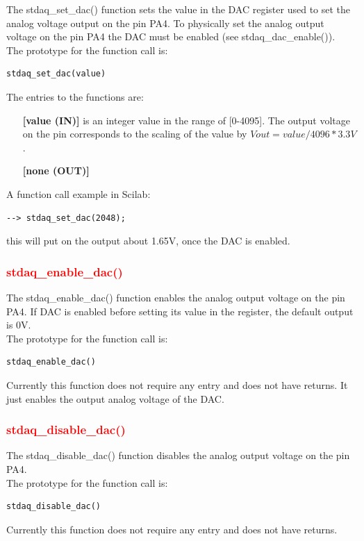 \documentclass[letterpaper,10pt,english]{hitec}
\begin{document}
The stdaq\_set\_dac() function sets the value in the DAC register used to set the analog voltage output on the pin PA4. To physically set the analog output voltage on the pin PA4 the DAC must be enabled (see stdaq\_dac\_enable()). \\
The prototype for the function call is:
\begin{verbatim}
stdaq_set_dac(value)
\end{verbatim}
The entries to the functions are:
\begin{itemize}
\item [\textbf{[value (IN)]}] is an integer value in the range of [0-4095]. The output voltage on the pin corresponds to the scaling of the value by $Vout = value/4096*3.3V$.
\item [\textbf{[none (OUT)]}] 
\end{itemize}
A function call example in Scilab:
\begin{verbatim}
--> stdaq_set_dac(2048);
\end{verbatim}
this will put on the output about 1.65V, once the DAC is enabled.

\subsubsection{\textcolor{red}{stdaq\_enable\_dac()}}

The stdaq\_enable\_dac() function enables the analog output voltage on the pin PA4. If DAC is enabled before setting its value in the register, the default output is 0V. \\
The prototype for the function call is:
\begin{verbatim}
stdaq_enable_dac()
\end{verbatim}
Currently this function does not require any entry and does not have returns. It just enables the output analog voltage of the DAC.

\subsubsection{\textcolor{red}{stdaq\_disable\_dac()}}

The stdaq\_disable\_dac() function disables the analog output voltage on the pin PA4. \\
The prototype for the function call is:
\begin{verbatim}
stdaq_disable_dac()
\end{verbatim}
Currently this function does not require any entry and does not have returns.
\end{document}
